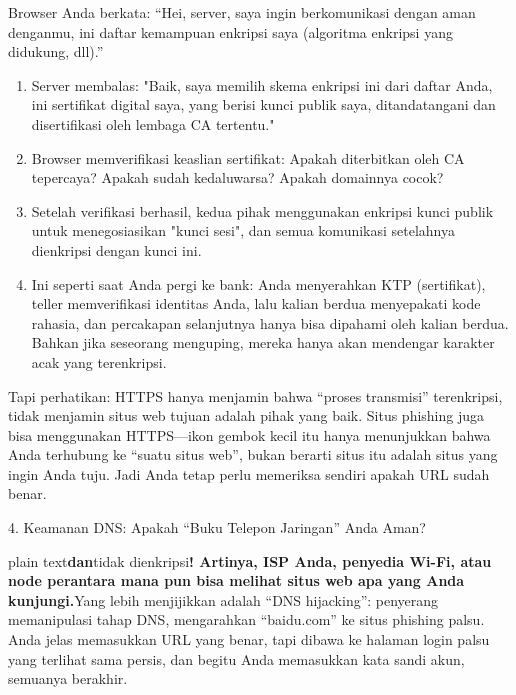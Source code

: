 
Browser Anda berkata: “Hei, server, saya ingin berkomunikasi dengan aman denganmu, ini daftar kemampuan enkripsi saya (algoritma enkripsi yang didukung, dll).”

\begin{enumerate}
  \item Server membalas: "Baik, saya memilih skema enkripsi ini dari daftar Anda, ini sertifikat digital saya, yang berisi kunci publik saya, ditandatangani dan disertifikasi oleh lembaga CA tertentu."
  \item Browser memverifikasi keaslian sertifikat: Apakah diterbitkan oleh CA tepercaya? Apakah sudah kedaluwarsa? Apakah domainnya cocok?
  \item Setelah verifikasi berhasil, kedua pihak menggunakan enkripsi kunci publik untuk menegosiasikan "kunci sesi", dan semua komunikasi setelahnya dienkripsi dengan kunci ini.
  \item Ini seperti saat Anda pergi ke bank: Anda menyerahkan KTP (sertifikat), teller memverifikasi identitas Anda, lalu kalian berdua menyepakati kode rahasia, dan percakapan selanjutnya hanya bisa dipahami oleh kalian berdua. Bahkan jika seseorang menguping, mereka hanya akan mendengar karakter acak yang terenkripsi.
\end{enumerate}

Tapi perhatikan: HTTPS hanya menjamin bahwa “proses transmisi” terenkripsi, tidak menjamin situs web tujuan adalah pihak yang baik. Situs phishing juga bisa menggunakan HTTPS—ikon gembok kecil itu hanya menunjukkan bahwa Anda terhubung ke “suatu situs web”, bukan berarti situs itu adalah situs yang ingin Anda tuju. Jadi Anda tetap perlu memeriksa sendiri apakah URL sudah benar.

4. Keamanan DNS: Apakah “Buku Telepon Jaringan” Anda Aman?


plain text\textbf{dan}tidak dienkripsi\textbf{! Artinya, ISP Anda, penyedia Wi-Fi, atau node perantara mana pun bisa melihat situs web apa yang Anda kunjungi.}Yang lebih menjijikkan adalah “DNS hijacking”: penyerang memanipulasi tahap DNS, mengarahkan “baidu.com” ke situs phishing palsu. Anda jelas memasukkan URL yang benar, tapi dibawa ke halaman login palsu yang terlihat sama persis, dan begitu Anda memasukkan kata sandi akun, semuanya berakhir.

